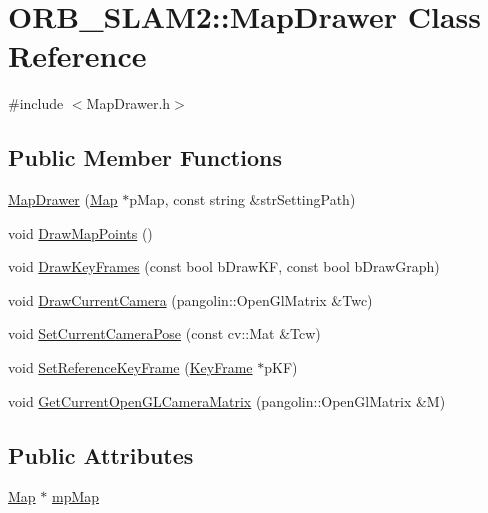\hypertarget{class_o_r_b___s_l_a_m2_1_1_map_drawer}{}\section{O\+R\+B\+\_\+\+S\+L\+A\+M2\+:\+:Map\+Drawer Class Reference}
\label{class_o_r_b___s_l_a_m2_1_1_map_drawer}


{\ttfamily \#include $<$Map\+Drawer.\+h$>$}

\subsection*{Public Member Functions}
\begin{DoxyCompactItemize}
\item 
\mbox{\hyperlink{class_o_r_b___s_l_a_m2_1_1_map_drawer_a649a10671736e192e85a6d824d776fc1}{Map\+Drawer}} (\mbox{\hyperlink{class_o_r_b___s_l_a_m2_1_1_map}{Map}} $\ast$p\+Map, const string \&str\+Setting\+Path)
\item 
void \mbox{\hyperlink{class_o_r_b___s_l_a_m2_1_1_map_drawer_a79991cc944076440e4ce4326436da285}{Draw\+Map\+Points}} ()
\item 
void \mbox{\hyperlink{class_o_r_b___s_l_a_m2_1_1_map_drawer_a5e00f408c3c2d1878ca53930903caa5f}{Draw\+Key\+Frames}} (const bool b\+Draw\+KF, const bool b\+Draw\+Graph)
\item 
void \mbox{\hyperlink{class_o_r_b___s_l_a_m2_1_1_map_drawer_af8d3dec705fc048dac229cf682bfceb1}{Draw\+Current\+Camera}} (pangolin\+::\+Open\+Gl\+Matrix \&Twc)
\item 
void \mbox{\hyperlink{class_o_r_b___s_l_a_m2_1_1_map_drawer_ac8c03502b5878303b31816ce5dfd9c0a}{Set\+Current\+Camera\+Pose}} (const cv\+::\+Mat \&Tcw)
\item 
void \mbox{\hyperlink{class_o_r_b___s_l_a_m2_1_1_map_drawer_ac72cc0b3e9e3a92527b38ca12230e79c}{Set\+Reference\+Key\+Frame}} (\mbox{\hyperlink{class_o_r_b___s_l_a_m2_1_1_key_frame}{Key\+Frame}} $\ast$p\+KF)
\item 
void \mbox{\hyperlink{class_o_r_b___s_l_a_m2_1_1_map_drawer_a872b93687086460e398e912191c91aca}{Get\+Current\+Open\+G\+L\+Camera\+Matrix}} (pangolin\+::\+Open\+Gl\+Matrix \&M)
\end{DoxyCompactItemize}
\subsection*{Public Attributes}
\begin{DoxyCompactItemize}
\item 
\mbox{\hyperlink{class_o_r_b___s_l_a_m2_1_1_map}{Map}} $\ast$ \mbox{\hyperlink{class_o_r_b___s_l_a_m2_1_1_map_drawer_aa10e7a80919749c11774eb84219f0a4b}{mp\+Map}}
\end{DoxyCompactItemize}
